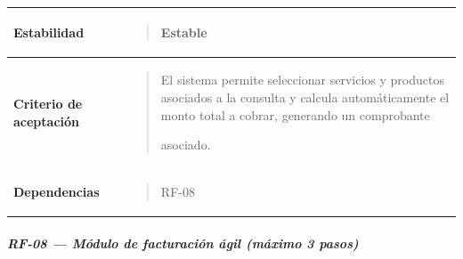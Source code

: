 \documentclass[
]{article}
\newcounter{none} %
\begin{document}
{\def\LTcaptype{none} %
\begin{longtable}[]{@{}
  >{\raggedright\arraybackslash}p{}
  >{\raggedright\arraybackslash}p{}@{}}
\toprule\noalign{}
\begin{minipage}[b]{\linewidth}\raggedright
\textbf{Estabilidad}
\end{minipage} & \begin{minipage}[b]{\linewidth}\raggedright
\begin{quote}
Estable
\end{quote}
\end{minipage} \\
\midrule\noalign{}
\endhead
\bottomrule\noalign{}
\endlastfoot
\textbf{Criterio de aceptación} &
\begin{minipage}[t]{\linewidth}\raggedright
\begin{quote}
El sistema permite seleccionar servicios y productos asociados a la
consulta y calcula automáticamente el monto total a cobrar, generando un
comprobante

asociado.
\end{quote}
\end{minipage} \\
\textbf{Dependencias} & \begin{minipage}[t]{\linewidth}\raggedright
\begin{quote}
RF-08
\end{quote}
\end{minipage} \\
\end{longtable}
}

\subparagraph{RF-08 --- Módulo de facturación ágil (máximo 3
pasos)}\label{rf-08-muxf3dulo-de-facturaciuxf3n-uxe1gil-muxe1ximo-3-pasos}
\end{document}
